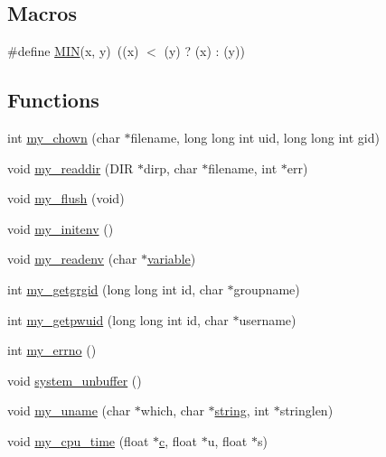 \subsection*{Macros}
\begin{DoxyCompactItemize}
\item 
\#define \hyperlink{C-M__system_8c_a74e75242132eaabbc1c512488a135926}{M\+IN}(x,  y)~((x) $<$ (y) ? (x) \+: (y))
\end{DoxyCompactItemize}
\subsection*{Functions}
\begin{DoxyCompactItemize}
\item 
int \hyperlink{C-M__system_8c_acfa12de4342c03519fc35d7892db94b2}{my\+\_\+chown} (char $\ast$filename, long long int uid, long long int gid)
\item 
void \hyperlink{C-M__system_8c_a56eb1f4025386fefa96810c8846a75ca}{my\+\_\+readdir} (D\+IR $\ast$dirp, char $\ast$filename, int $\ast$err)
\item 
void \hyperlink{C-M__system_8c_aaf9088f4cc3498dcf1abec624adabe76}{my\+\_\+flush} (void)
\item 
void \hyperlink{C-M__system_8c_ab5188f2ca99719a14c77a1acae06f93a}{my\+\_\+initenv} ()
\item 
void \hyperlink{C-M__system_8c_a0114eece06797ba0c5e6f5948841501a}{my\+\_\+readenv} (char $\ast$\hyperlink{M__stopwatch_83_8txt_a2fa76741434e14a1b61bcbd4629b9cec}{variable})
\item 
int \hyperlink{C-M__system_8c_a13b282e9de0dc0bb29bec1d76aaf6cf0}{my\+\_\+getgrgid} (long long int id, char $\ast$groupname)
\item 
int \hyperlink{C-M__system_8c_a0feb597a044e16699952e0056390f3d6}{my\+\_\+getpwuid} (long long int id, char $\ast$username)
\item 
int \hyperlink{C-M__system_8c_ad9bbaffdef223d18bb59a22c3c599201}{my\+\_\+errno} ()
\item 
void \hyperlink{C-M__system_8c_ab955d6c562df08b9e465fe3cea24d83d}{system\+\_\+unbuffer} ()
\item 
void \hyperlink{C-M__system_8c_ab341d42a9117c4bd188dcdcbff69fe9a}{my\+\_\+uname} (char $\ast$which, char $\ast$\hyperlink{what__overview_81_8txt_a74cb7e955273b9f9157b4f0c18a38849}{string}, int $\ast$stringlen)
\item 
void \hyperlink{C-M__system_8c_aae18c27a21f7c4aed7328460a7edb34c}{my\+\_\+cpu\+\_\+time} (float $\ast$\hyperlink{c_8f90_aeb1f4e639be0213b4cbd07f2583a5b1f}{c}, float $\ast$u, float $\ast$s)

\end{DoxyCompactItemize}
